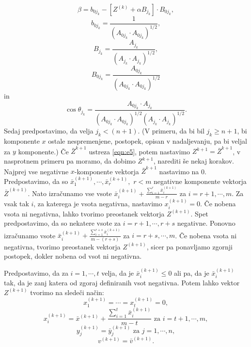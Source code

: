 \documentclass[a4paper,12pt]{article}
\begin{document}
\begin{equation*}
    \beta = b_{0j_k} - [Z^{(k)} + \alpha B_{j_k}] \cdot B_{0j_k},
\end{equation*}
\begin{equation*}
    b_{0j_k} = \frac{1}{(A_{0j_k}\cdot A_{0j_k})^{1/2}},
\end{equation*}
\begin{equation*}
B_{j_k} = \frac{A_{j_k}}{(A_{j_k} \cdot A_{j_k})^{1/2}}, 
\end{equation*}
\begin{equation*}
B_{0j_k} = \frac{A_{0j_k}}{(A_{0j_k}\cdot A_{0j_k})^{1/2}}
\end{equation*}
in 
\begin{equation*}
 \cos{\theta_{j_k}} = \frac{A_{0j_k} \cdot A_{j_k}}{(A_{0j_k}\cdot A_{0j_k})^{1/2}(A_{j_k}\cdot A_{j_k})^{1/2}}.
\end{equation*}
Sedaj predpostavimo, da velja $j_k < (n +1)$. (V primeru, da bi bil $j_k \geq n + 1$, bi komponente $x$ ostale nespremenjene, postopek, opisan v nadaljevanju, pa bi veljal za $y$ komponente.)
Če $\bar{Z}^{k+1}$ ustreza \ref{eqn:e5}, potem nastavimo $Z^{k+1} = \bar{Z}^{k+1}$,
v nasprotnem primeru pa moramo, da dobimo $Z^{k+1}$, narediti še nekaj korakov. Najprej vse negativne $x$-komponente vektorja $\bar{Z}^{k+1}$ nastavimo na 0.
Predpostavimo, da so $\bar{x}_1^{(k+1)}, \cdots, \bar{x}_r^{(k+1)}, \, \, r < m$ negativne komponente vektorja $\bar{Z}^{(k+1)}$. Nato 
izračunamo vse vsote $\bar{x}_i^{(k+1)} + \frac{\sum_{i=1}^r \bar{x}_i^{(k+1)}}{m - r} $ za $i = r +1, \cdots, m$. Za vsak tak $i$, za katerega
je vsota negativna, nastavimo $x_i^{(k+1)} = 0$. Če nobena vsota ni negativna, lahko tvorimo preostanek vektorja $Z^{(k+1)}$. Spet predpostavimo, da so nekatere vsote za $i = r+1, \cdots, r +s$ negativne. Ponovno izračunamo vsote 
$\bar{x}_i^{(k+1)} + \frac{\sum_{i=1}^{r+s} \bar{x}_i^{(k+1)}}{m - (r+s)} $ za $i = r + s, \cdots, m$. Če nobena vsota ni negativna, tvorimo preostanek vektorja $Z^{(k+1)}$, sicer pa ponavljamo zgornji postopek, dokler nobena od vsot ni negativna.\par
Predpostavimo, da za $i = 1, \cdots, t$ velja, da je $\bar{x}_i^{(k+1)} \leq 0$ ali pa, da je $\bar{x}_i^{(k+1)}$ tak, da je zanj katera od zgoraj definiranih vsot negativna. Potem lahko vektor $Z^{(k+1)}$
tvorimo na sledeči način:
\begin{equation*}
    x_1^{(k+1)} = \cdots = x_t^{(k+1)} = 0,
\end{equation*}  
\begin{equation*}
    x_i^{(k+1)} = \bar{x}^{(k+1)} +  \frac{\sum_{i=1}^{t}\bar{x}_i^{(k+1)}}{m-t} \, \, \text{za} \, \, i = t+1, \cdots, m,
\end{equation*}
\begin{equation*}
    y_j^{(k+1)} = \bar{y}_j^{(k+1)} \, \, \text{za} \, \, j = 1, \cdots, n,
\end{equation*}
\begin{equation*}
    v^{(k+1)} = \bar{v}^{(k+1)}.
\end{equation*}
\end{document}
